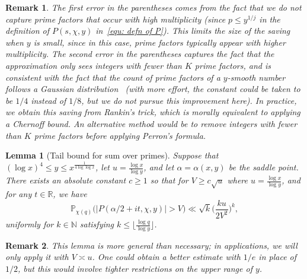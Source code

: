 \documentclass[a4paper,12pt,reqno]{amsart}
\newtheorem*{xremark}{Remark}
\newtheorem{lemma}{Lemma}
\newcommand{\N}{\mathbb{N}}
\newcommand{\R}{\mathbb{R}}
\newcommand{\p}{\mathbb{P}}
\begin{document}
\begin{xremark}
\normalfont The first error in the parentheses comes from the fact that we do not capture prime factors that occur with high multiplicity (since $p \leq y^{1/j}$ in the definition of $P(s,\chi,y)$ in~\eqref{equ: defn of P}). This limits the size of the saving when $y$ is small, since in this case, prime factors typically appear with higher multiplicity. The second error in the parentheses captures the fact that the approximation only sees integers with fewer than $K$ prime factors, and is consistent with the fact that the count of prime factors of a $y$-smooth number follows a Gaussian distribution~\cite{Alladi} (with more effort, the constant could be taken to be $1/4$ instead of $1/8$, but we do not pursue this improvement here). In practice, we obtain this saving from Rankin's trick, which is morally equivalent to applying a Chernoff bound. An alternative method would be to remove integers with fewer than $K$ prime factors before applying Perron's formula.
\end{xremark}

\begin{lemma}[Tail bound for sum over primes]\label{l: large value bound}
Suppose that $(\log x)^4 \leq y \leq x^{\frac{1}{4 \log \log x}}$, let $u = \frac{\log x}{\log y}$, and let $\alpha = \alpha (x,y)$ be the saddle point. There exists an absolute constant $c \geq 1$ so that for $V \geq c \sqrt{u}$ where $u=\frac{\log x}{\log y}$, and for any $t \in \R$, we have
\[
\p_{\chi(q)} \bigl( |P(\alpha / 2 + it, \chi , y) | > V \bigr) \ll \sqrt{k} \biggl( \frac{k u}{2 V^2} \biggr)^{k} ,
\]
uniformly for $k \in \N$ satisfying $k \leq \lfloor \frac{\log q}{\log y} \rfloor$.
\end{lemma}

\begin{xremark}
\normalfont This lemma is more general than necessary; in applications, we will only apply it with $V \asymp u$. One could obtain a better estimate with $1/e$ in place of $1/2$, but this would involve tighter restrictions on the upper range of $y$.
\end{xremark}
\end{document}
